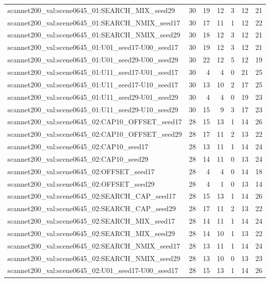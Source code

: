 \begin{table}[t]
\begin{tabular}{lrrrrrr}
scannet200\_val:scene0645\_01:SEARCH\_MIX\_seed29 & 30 & 19 & 12 & 3 & 12 & 21 \\
scannet200\_val:scene0645\_01:SEARCH\_NMIX\_seed17 & 30 & 17 & 11 & 1 & 12 & 22 \\
scannet200\_val:scene0645\_01:SEARCH\_NMIX\_seed29 & 30 & 18 & 12 & 3 & 12 & 21 \\
scannet200\_val:scene0645\_01:U01\_seed17-U00\_seed17 & 30 & 19 & 12 & 3 & 12 & 21 \\
scannet200\_val:scene0645\_01:U01\_seed29-U00\_seed29 & 30 & 22 & 12 & 5 & 12 & 19 \\
scannet200\_val:scene0645\_01:U11\_seed17-U01\_seed17 & 30 & 4 & 4 & 0 & 21 & 25 \\
scannet200\_val:scene0645\_01:U11\_seed17-U10\_seed17 & 30 & 13 & 10 & 2 & 17 & 25 \\
scannet200\_val:scene0645\_01:U11\_seed29-U01\_seed29 & 30 & 4 & 4 & 0 & 19 & 23 \\
scannet200\_val:scene0645\_01:U11\_seed29-U10\_seed29 & 30 & 15 & 9 & 3 & 17 & 23 \\
scannet200\_val:scene0645\_02:CAP10\_OFFSET\_seed17 & 28 & 15 & 13 & 1 & 14 & 26 \\
scannet200\_val:scene0645\_02:CAP10\_OFFSET\_seed29 & 28 & 17 & 11 & 2 & 13 & 22 \\
scannet200\_val:scene0645\_02:CAP10\_seed17 & 28 & 13 & 11 & 1 & 14 & 24 \\
scannet200\_val:scene0645\_02:CAP10\_seed29 & 28 & 14 & 11 & 0 & 13 & 24 \\
scannet200\_val:scene0645\_02:OFFSET\_seed17 & 28 & 4 & 4 & 0 & 14 & 18 \\
scannet200\_val:scene0645\_02:OFFSET\_seed29 & 28 & 4 & 1 & 0 & 13 & 14 \\
scannet200\_val:scene0645\_02:SEARCH\_CAP\_seed17 & 28 & 15 & 13 & 1 & 14 & 26 \\
scannet200\_val:scene0645\_02:SEARCH\_CAP\_seed29 & 28 & 17 & 11 & 2 & 13 & 22 \\
scannet200\_val:scene0645\_02:SEARCH\_MIX\_seed17 & 28 & 14 & 11 & 1 & 14 & 24 \\
scannet200\_val:scene0645\_02:SEARCH\_MIX\_seed29 & 28 & 14 & 10 & 1 & 13 & 22 \\
scannet200\_val:scene0645\_02:SEARCH\_NMIX\_seed17 & 28 & 13 & 11 & 1 & 14 & 24 \\
scannet200\_val:scene0645\_02:SEARCH\_NMIX\_seed29 & 28 & 13 & 10 & 0 & 13 & 23 \\
scannet200\_val:scene0645\_02:U01\_seed17-U00\_seed17 & 28 & 15 & 13 & 1 & 14 & 26 \\

\end{tabular}
\end{table}
